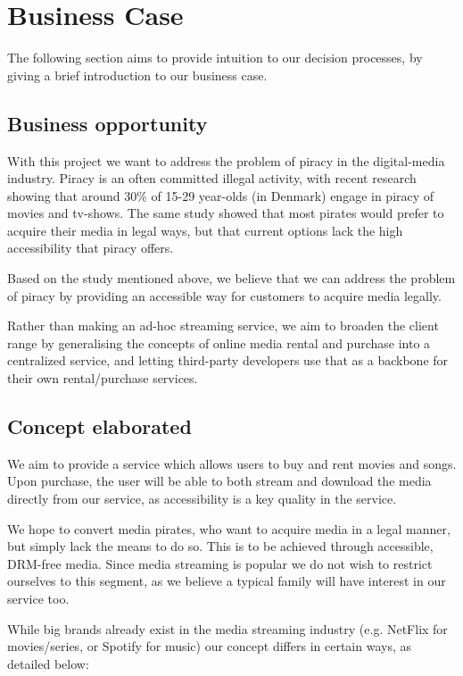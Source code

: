 \section{Business Case}
The following section aims to provide intuition to our decision processes, by
giving a brief introduction to our business case.

\subsection{Business opportunity}
With this project we want to address the problem of piracy in the digital-media
industry. Piracy is an often committed illegal activity, with recent research
showing that around 30\% of 15-29 year-olds (in Denmark) engage in piracy of
movies and tv-shows\cite{pirates}. The same study showed that most pirates
would prefer to acquire their media in legal ways, but that current options
lack the high accessibility that piracy offers.

Based on the study mentioned above, we believe that we can address the problem
of piracy by providing an accessible way for customers to acquire media
legally.

Rather than making an ad-hoc streaming service, we aim to broaden the client
range by generalising the concepts of online media rental and purchase into a
centralized service, and letting third-party developers use that as a backbone
for their own rental/purchase services.

\subsection{Concept elaborated}
We aim to provide a service which allows users to buy and rent movies and
songs. Upon purchase, the user will be able to both stream and download the
media directly from our service, as accessibility is a key quality in the
service.

We hope to convert media pirates, who want to acquire media in a legal manner,
but simply lack the means to do so. This is to be achieved through accessible,
DRM-free media. Since media streaming is popular\cite{ott} we do not wish to
restrict ourselves to this segment, as we believe a typical family will have
interest in our service too.

While big brands already exist in the media streaming industry (e.g. NetFlix
for movies/series, or Spotify for music) our concept differs in certain ways,
as detailed below:

